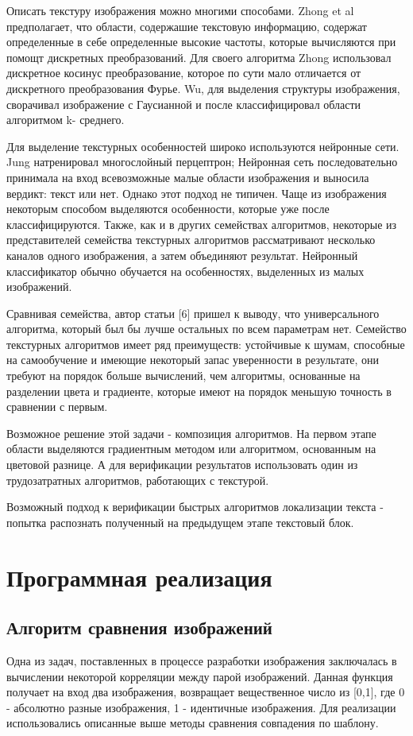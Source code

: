 \documentclass[oneside,final,14pt]{extreport}
\begin{document}
Описать текстуру изображения можно многими способами. Zhong et al предполагает, что области, содержашие текстовую информацию, содержат определенные в себе определенные высокие частоты, которые вычисляются при помощт дискретных преобразований. Для  своего алгоритма Zhong использовал дискретное косинус преобразование, которое по сути мало отличается от дискретного преобразования Фурье.  Wu, для выделения структуры изображения, сворачивал изображение с Гаусианной и после классифицировал области алгоритмом k- среднего.

Для выделение текстурных особенностей широко используются нейронные сети. Jung  натренировал многослойный перцептрон; Нейронная сеть последовательно принимала на вход всевозможные малые области изображения и выносила вердикт: текст или нет. Однако этот подход не типичен. Чаще из изображения некоторым способом выделяются особенности, которые уже после классифицируются.  Также, как и в других семействах алгоритмов, некоторые из представителей семейства текстурных алгоритмов рассматривают несколько каналов одного изображения, а затем объединяют результат. Нейронный классификатор обычно обучается на особенностях, выделенных из малых изображений.  

Сравнивая семейства, автор статьи [6] пришел к выводу, что универсального алгоритма, который был бы лучше остальных по всем параметрам нет.  Семейство текстурных алгоритмов имеет ряд преимуществ: устойчивые к шумам, способные на самообучение и имеющие некоторый запас уверенности в результате, они требуют на порядок больше вычислений, чем алгоритмы, основанные на разделении цвета и градиенте, которые имеют на порядок меньшую точность в сравнении с первым. 

Возможное решение этой задачи - композиция алгоритмов. На первом этапе области выделяются градиентным методом или алгоритмом, основанным на цветовой разнице. А для верификации результатов использовать один из трудозатратных алгоритмов, работающих с текстурой.   

Возможный подход к верификации быстрых алгоритмов локализации текста - попытка распознать полученный на предыдущем этапе текстовый блок.

\chapter{Программная реализация}
\section{Алгоритм сравнения изображений}
Одна из задач, поставленных в процессе разработки изображения заключалась в вычислении некоторой корреляции между парой изображений. Данная функция получает на вход два изображения, возвращает вещественное число из [0,1], где 0 - абсолютно разные изображения, 1 - идентичные изображения.  Для реализации использовались описанные выше методы сравнения совпадения по шаблону.
\end{document}
